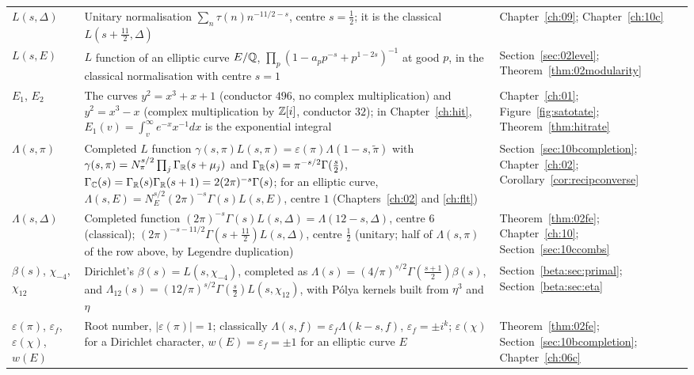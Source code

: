 {\begin{longtable}{p{0.8in}p{2.65in}p{0.95in}}
\raggedright $L(s,\Delta)$ & \raggedright Unitary normalisation $\sum_n\tau(n)n^{-11/2-s}$, centre $s=\frac12$; it is the classical $L(s+\frac{11}2,\Delta)$ & \raggedright Chapter~\ref{ch:09}; Chapter~\ref{ch:10c}\tabularnewline[1pt]
\raggedright $L(s,E)$ & \raggedright $L$ function of an elliptic curve $E/\mathbb{Q}$, $\prod_p(1-a_pp^{-s}+p^{1-2s})^{-1}$ at good $p$, in the classical normalisation with centre $s=1$ & \raggedright Section~\ref{sec:02level}; Theorem~\ref{thm:02modularity}\tabularnewline[1pt]
\raggedright $E_1$, $E_2$ & \raggedright The curves $y^2=x^3+x+1$ (conductor $496$, no complex multiplication) and $y^2=x^3-x$ (complex multiplication by $\mathbb{Z}[i]$, conductor $32$); in Chapter~\ref{ch:hit}, $E_1(v)=\int_v^\infty e^{-x}x^{-1}dx$ is the exponential integral & \raggedright Chapter~\ref{ch:01}; Figure~\ref{fig:satotate}; Theorem~\ref{thm:hitrate}\tabularnewline[1pt]
\raggedright $\Lambda(s,\pi)$ & \raggedright Completed $L$ function $\gamma(s,\pi)L(s,\pi)=\varepsilon(\pi)\Lambda(1-s,\tilde\pi)$ with $\gamma(s,\pi)=N_\pi^{s/2}\prod_j\Gamma_{\mathbb{R}}(s+\mu_j)$ and $\Gamma_{\mathbb{R}}(s)=\pi^{-s/2}\Gamma(\frac s2)$, $\Gamma_{\mathbb{C}}(s)=\Gamma_{\mathbb{R}}(s)\Gamma_{\mathbb{R}}(s+1)=2(2\pi)^{-s}\Gamma(s)$; for an elliptic curve, $\Lambda(s,E)=N_E^{s/2}(2\pi)^{-s}\Gamma(s)L(s,E)$, centre $1$ (Chapters~\ref{ch:02} and \ref{ch:flt}) & \raggedright Section~\ref{sec:10bcompletion}; Chapter~\ref{ch:02}; Corollary~\ref{cor:recipconverse}\tabularnewline[1pt]
\raggedright $\Lambda(s,\Delta)$ & \raggedright Completed function $(2\pi)^{-s}\Gamma(s)L(s,\Delta)=\Lambda(12-s,\Delta)$, centre $6$ (classical); $(2\pi)^{-s-11/2}\Gamma(s+\frac{11}2)L(s,\Delta)$, centre $\frac12$ (unitary; half of $\Lambda(s,\pi)$ of the row above, by Legendre duplication) & \raggedright Theorem~\ref{thm:02fe}; Chapter~\ref{ch:10}; Section~\ref{sec:10ccombs}\tabularnewline[1pt]
\raggedright $\beta(s)$, $\chi_{-4}$, $\chi_{12}$ & \raggedright Dirichlet's $\beta(s)=L(s,\chi_{-4})$, completed as $\Lambda(s)=(4/\pi)^{s/2}\Gamma(\frac{s+1}2)\beta(s)$, and $\Lambda_{12}(s)=(12/\pi)^{s/2}\Gamma(\frac s2)L(s,\chi_{12})$, with P\'olya kernels built from $\eta^3$ and $\eta$ & \raggedright Section~\ref{beta:sec:primal}; Section~\ref{beta:sec:eta}\tabularnewline[1pt]
\raggedright $\varepsilon(\pi)$, $\varepsilon_f$, $\varepsilon(\chi)$, $w(E)$ & \raggedright Root number, $|\varepsilon(\pi)|=1$; classically $\Lambda(s,f)=\varepsilon_f\Lambda(k-s,f)$, $\varepsilon_f=\pm i^k$; $\varepsilon(\chi)$ for a Dirichlet character, $w(E)=\varepsilon_f=\pm1$ for an elliptic curve $E$ & \raggedright Theorem~\ref{thm:02fe}; Section~\ref{sec:10bcompletion}; Chapter~\ref{ch:06c}\tabularnewline[1pt]

\end{longtable}}
